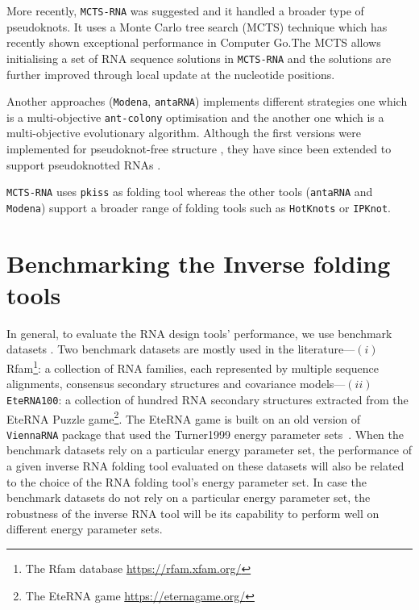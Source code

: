  More recently, \texttt{MCTS-RNA} was suggested and it handled a broader type of pseudoknots. It uses a Monte Carlo tree search (MCTS) technique which has recently  shown exceptional performance in Computer Go.The MCTS allows initialising a set of RNA sequence solutions in \texttt{MCTS-RNA} and the solutions are further improved through local update at the nucleotide positions.
 
 Another approaches (\texttt{Modena}, \texttt{antaRNA}) implements different strategies one which is a multi-objective \texttt{ant-colony} optimisation and the another one which is a multi-objective evolutionary algorithm.  Although the first versions were implemented for pseudoknot-free structure \cite{taneda2011modena, kleinkauf2015antarna}, they have since been extended to support pseudoknotted RNAs \cite{modena_2012, kleinkauf2015antarna2}. 
 
  \texttt{MCTS-RNA} uses \texttt{pkiss} as folding tool whereas the other tools (\texttt{antaRNA} and \texttt{Modena}) support a broader range of folding tools such as \texttt{HotKnots} or \texttt{IPKnot}. 
 
\section{Benchmarking the Inverse folding tools}
In general, to evaluate the RNA design tools' performance, we use benchmark datasets \cite{churkin2017design}. Two benchmark datasets are mostly used in the literature---$(i)$ Rfam\footnote{The Rfam database \url{https://rfam.xfam.org/}}: a collection of RNA families, each represented by multiple sequence alignments, consensus secondary structures and covariance models---$(ii)$ \texttt{EteRNA100}: a collection of hundred RNA secondary structures extracted from the EteRNA Puzzle game\footnote{The EteRNA game \url{https://eternagame.org/}}. The EteRNA game is built on an old version of \texttt{ViennaRNA} package that used the Turner1999 energy parameter sets~\cite{Turn1999}. When the benchmark datasets rely on a particular energy parameter set, the performance of a given inverse RNA folding tool evaluated on these datasets will also be related to the choice of the RNA folding tool's energy parameter set. In case the benchmark datasets do not rely on a particular energy parameter set, the robustness of the inverse RNA tool will be its capability to perform well on different energy parameter sets.

